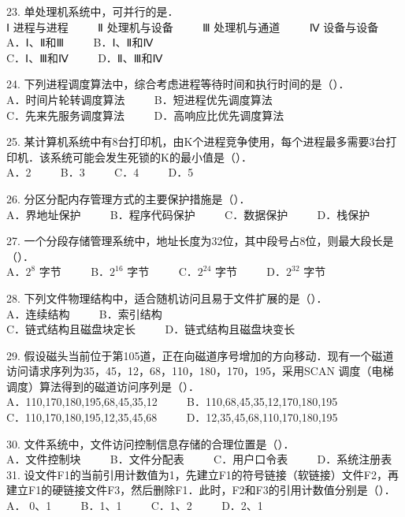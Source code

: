 23. 单处理机系统中，可并行的是． \\
Ⅰ 进程与进程 $\qquad$ Ⅱ 处理机与设备 $\qquad$ Ⅲ 处理机与通道  $\qquad$ Ⅳ 设备与设备 \\
A．Ⅰ、Ⅱ和Ⅲ $\qquad$ B．Ⅰ、Ⅱ和Ⅳ \\
C．Ⅰ、Ⅲ和Ⅳ $\qquad$ D．Ⅱ、Ⅲ和Ⅳ

24. 下列进程调度算法中，综合考虑进程等待时间和执行时间的是（）． \\
A．时间片轮转调度算法 $\qquad$ B．短进程优先调度算法 \\
C．先来先服务调度算法 $\qquad$ D．高响应比优先调度算法

25. 某计算机系统中有8台打印机，由K个进程竞争使用，每个进程最多需要3台打印机．该系统可能会发生死锁的K的最小值是（）． \\
A．2 $\qquad$ B．3 $\qquad$ C．4 $\qquad$ D．5

26. 分区分配内存管理方式的主要保护措施是（）． \\
A．界地址保护 $\qquad$ B．程序代码保护 $\qquad$ C．数据保护 $\qquad$ D．栈保护

27. 一个分段存储管理系统中，地址长度为32位，其中段号占8位，则最大段长是（）． \\
A．$2^8$ 字节 $\qquad$ B．$2^{16}$ 字节 $\qquad$ C．$2^{24}$ 字节 $\qquad$ D．$2^{32}$ 字节

28. 下列文件物理结构中，适合随机访问且易于文件扩展的是（）． \\
A．连续结构 $\qquad$ B．索引结构 \\
C．链式结构且磁盘块定长 $\qquad$ D．链式结构且磁盘块变长

29. 假设磁头当前位于第105道，正在向磁道序号增加的方向移动．现有一个磁道访问请求序列为35，45，12，68，110，180，170，195，采用SCAN 调度（电梯调度）算法得到的磁道访问序列是（）． \\
A．110,170,180,195,68,45,35,12 $\qquad$ B．110,68,45,35,12,170,180,195 \\
C．110,170,180,195,12,35,45,68 $\qquad$ D．12,35,45,68,110,170,180,195

30. 文件系统中，文件访问控制信息存储的合理位置是（）． \\
A．文件控制块 $\qquad$ B．文件分配表 $\qquad$ C．用户口令表 $\qquad$ D．系统注册表 \\

31. 设文件F1的当前引用计数值为1，先建立F1的符号链接（软链接）文件F2，再建立F1的硬链接文件F3，然后删除F1．此时，F2和F3的引用计数值分别是（）． \\
A． 0、1 $\qquad$ B．1、1 $\qquad$ C．1、2 $\qquad$ D．2、1

